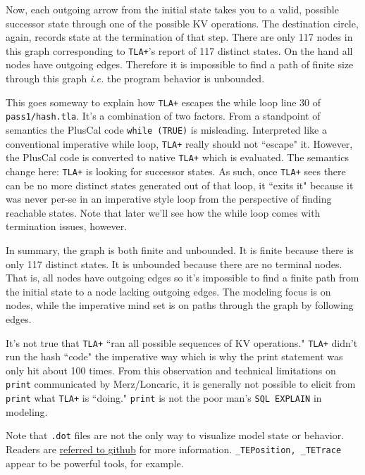 \documentclass[twocolumn]{article}
\begin{document}
Now, each outgoing arrow from the initial state takes you to a valid, possible successor state through one of the possible KV operations. The destination circle, again, records state at the termination of that step. There are only 117 nodes in this graph corresponding to \texttt{TLA+}'s report of 117 distinct states. On the hand all nodes have outgoing edges. Therefore it is impossible to find a path of finite size through this graph \emph{i.e.} the program behavior is unbounded. 

This goes someway to explain how \texttt{TLA+} escapes the while loop line 30 of \texttt{pass1/hash.tla}. It's a combination of two factors. From a standpoint of semantics the PlusCal code \texttt{while (TRUE)} is misleading. Interpreted like a conventional imperative while loop, \texttt{TLA+} really should not ``escape" it. However, the PlusCal code is converted to native \texttt{TLA+} which is evaluated. The semantics change here: \texttt{TLA+} is looking for successor states. As such, once \texttt{TLA+} sees there can be no more distinct states generated out of that loop, it ``exits it" because it was never per-se in an imperative style loop from the perspective of finding reachable states. Note that later we'll see how the while loop comes with termination issues, however.

In summary, the graph is both finite and unbounded. It is finite because there is only 117 distinct states. It is unbounded because there are no terminal nodes. That is, all nodes have outgoing edges so it's impossible to find a finite path from the initial state to a node lacking outgoing edges. The modeling focus is on nodes, while the imperative mind set is on paths through the graph by following edges. 

It's not true that \texttt{TLA+} ``ran all possible sequences of KV operations." \texttt{TLA+} didn't run the hash ``code" the imperative way which is why the print statement was only hit about 100 times. From this observation and technical limitations on \texttt{print} communicated by Merz/Loncaric, it is generally not possible to elicit from \texttt{print} what \texttt{TLA+} is ``doing." \texttt{print} is not the poor man's \texttt{SQL EXPLAIN} in modeling.

Note that \texttt{.dot} files are not the only way to visualize model state or behavior. Readers are \href{https://github.com/tlaplus/tlaplus/issues/540}{referred to github} for more information. \texttt{\_TEPosition, \_TETrace} appear to be powerful tools, for example.
\end{document}

